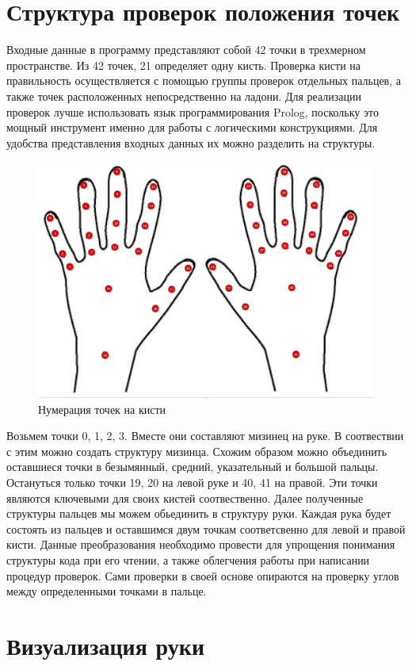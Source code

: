 \section{Структура проверок положения точек}
\hspace{0.6cm}Входные данные в программу представляют собой 42 точки в трехмерном пространстве. Из 42 точек, 21 определяет одну кисть.
\hspace{0.6cm}Проверка кисти на правильность осуществляется с помощью группы проверок отдельных пальцев, а также точек расположенных непосредственно на ладони. Для реализации проверок лучше использовать язык программирования Prolog, поскольку это мощный инструмент именно для работы с логическими конструкциями.
\hspace{0.6cm}Для удобства представления входных данных их можно разделить на структуры. 
\begin{figure}[ht!]
	\centering
	\includegraphics[scale=0.65]{Kist.jpg}
	\caption{Нумерация точек на кисти}
	\label{fig:hands}
\end{figure}
\hspace{0.6cm}Возьмем точки 0, 1, 2, 3. Вместе они составляют мизинец на руке. В соотвествии с этим можно создать структуру мизинца. Схожим образом можно объединить оставшиеся точки в безымянный, средний, указательный и большой пальцы. Остануться только точки 19, 20 на левой руке и 40, 41 на правой. Эти точки являются ключевыми для своих кистей соотвественно.
\hspace{0.6cm}Далее полученные структуры пальцев мы можем обьединить в структуру руки. Каждая рука будет состоять из пальцев и оставшимся двум точкам соответсвенно для левой и правой кисти. 
\hspace{0.6cm}Данные преобразования необходимо провести для упрощения понимания структуры кода при его чтении, а также облегчения работы при написании процедур проверок.
\hspace{0.6cm}Сами проверки в своей основе опираются на проверку углов между определенными точками в пальце.  

\section{Визуализация руки}


